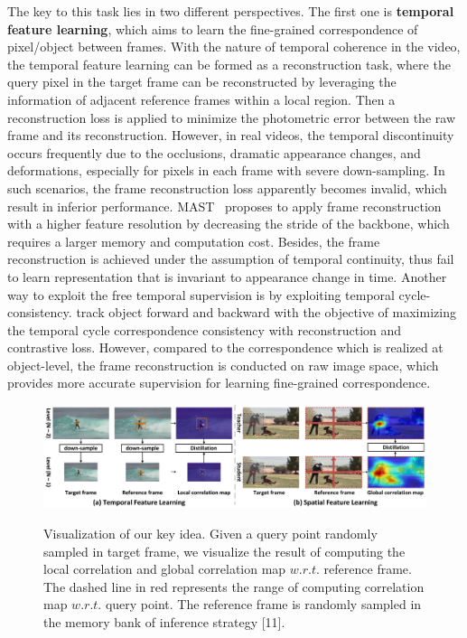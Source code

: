\documentclass{article}
\begin{document}
The key to this task lies in two different perspectives. The first one is \textbf{temporal feature learning}, which aims to learn the fine-grained correspondence of pixel/object between frames. With the nature of temporal coherence in the video, the temporal feature learning can be formed as a reconstruction task, where the query pixel in the target frame can be reconstructed by leveraging the information of adjacent reference frames within a local region. Then a reconstruction loss is applied to minimize the photometric error between the raw frame and its reconstruction. However, in real videos, the temporal discontinuity occurs frequently due to the occlusions, dramatic appearance changes, and deformations, especially for pixels in each frame with severe down-sampling. In such scenarios, the frame reconstruction loss apparently becomes invalid, which result in inferior performance. MAST~\cite{lai2020mast} proposes to apply frame reconstruction with a higher feature resolution by decreasing the stride of the backbone, which requires a larger memory and computation cost. Besides, the frame reconstruction is achieved under the assumption of temporal continuity, thus fail to learn representation that is invariant to appearance change in time.  Another way to exploit the free temporal supervision is by exploiting temporal cycle-consistency.  \cite{jabri2020space}\cite{wang2019learning} track object forward and backward with the objective of maximizing the temporal cycle correspondence consistency with reconstruction and contrastive loss. However, compared to the correspondence which is realized at object-level, the frame reconstruction is conducted on raw image space, which provides more accurate supervision for learning fine-grained correspondence.

\begin{figure}[!tb]
  \centering
  {\includegraphics[width=1.0\textwidth]{figure/tissor/tissor6.pdf}}
  \caption{\small Visualization of our key idea. Given a query point randomly sampled in target frame, we visualize the result of computing the local correlation and global correlation map $w.r.t.$ reference frame. The dashed line in red represents the range of computing correlation map $w.r.t.$ query point. The reference frame is randomly sampled in the memory bank of inference strategy [11]. }
  \label{fig:tissor}
  \vspace{-6mm}
\end{figure}
\end{document}
